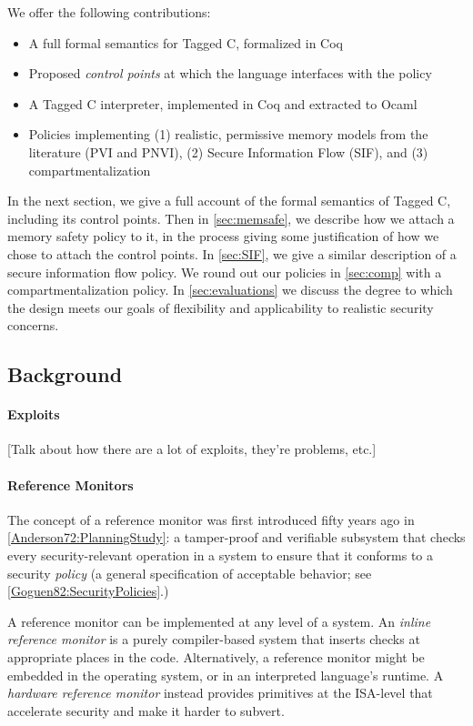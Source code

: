 \documentclass[acmsmall,review,anonymous]{acmart}\settopmatter{printfolios=true,printccs=false,printacmref=false}
\begin{document}
We offer the following contributions:

\begin{itemize}
\item A full formal semantics for Tagged C, formalized in Coq
\item Proposed {\em control points} at which the language interfaces with the policy
\item A Tagged C interpreter, implemented in Coq and extracted to Ocaml
\item Policies implementing (1) realistic, permissive memory models from the literature (PVI and PNVI),
  (2) Secure Information Flow (SIF), and (3) compartmentalization
\end{itemize}

In the next section, we give a full account of the formal semantics of Tagged C,
including its control points. Then in \cref{sec:memsafe}, we describe how we attach
a memory safety policy to it, in the process giving some justification of how we chose to
attach the control points. In \cref{sec:SIF}, we give a similar description of
a secure information flow policy. We round out our policies in \cref{sec:comp} with
a compartmentalization policy. In \cref{sec:evaluations} we discuss the degree to
which the design meets our goals of flexibility and applicability to realistic
security concerns.

\subsection{Background}

\paragraph{Exploits}

[Talk about how there are a lot of exploits, they're problems, etc.]

\paragraph{Reference Monitors}

The concept of a reference monitor was first introduced fifty years ago in \cref{Anderson72:PlanningStudy}:
a tamper-proof and verifiable subsystem that checks every security-relevant operation in a system to
ensure that it conforms to a security {\em policy} (a general specification of acceptable behavior;
see \cref{Goguen82:SecurityPolicies}.)

A reference monitor can be implemented at any level of a system. An {\em inline reference monitor}
is a purely compiler-based system that inserts checks at appropriate places in the code.
Alternatively, a reference monitor might be embedded in the operating system, or in an interpreted
language's runtime. A {\em hardware reference monitor} instead provides primitives at the ISA-level
that accelerate security and make it harder to subvert.
\end{document}
